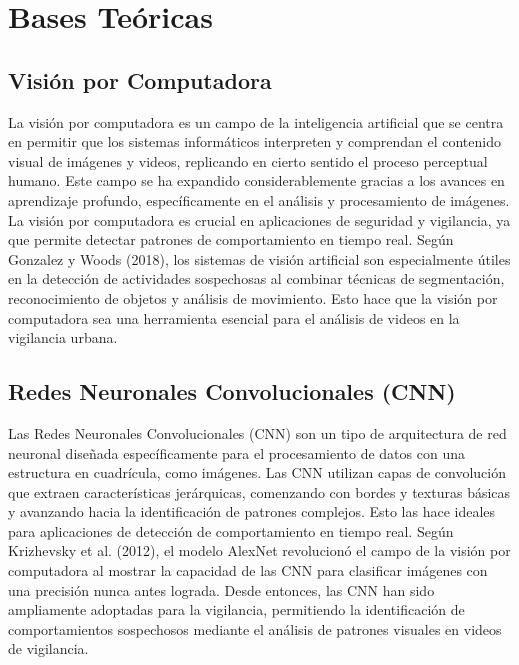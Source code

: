 \documentclass[listof=nochaptergap,12pt,times,authoryear]{report}
\begin{document}
\section{Bases Teóricas}

\subsection{Visión por Computadora}
La visión por computadora es un campo de la inteligencia artificial que se centra en permitir que los sistemas informáticos interpreten y comprendan el contenido visual de imágenes y videos, replicando en cierto sentido el proceso perceptual humano. Este campo se ha expandido considerablemente gracias a los avances en aprendizaje profundo, específicamente en el análisis y procesamiento de imágenes. La visión por computadora es crucial en aplicaciones de seguridad y vigilancia, ya que permite detectar patrones de comportamiento en tiempo real. Según Gonzalez y Woods (2018), los sistemas de visión artificial son especialmente útiles en la detección de actividades sospechosas al combinar técnicas de segmentación, reconocimiento de objetos y análisis de movimiento. Esto hace que la visión por computadora sea una herramienta esencial para el análisis de videos en la vigilancia urbana.

\subsection{Redes Neuronales Convolucionales (CNN)}
Las Redes Neuronales Convolucionales (CNN) son un tipo de arquitectura de red neuronal diseñada específicamente para el procesamiento de datos con una estructura en cuadrícula, como imágenes. Las CNN utilizan capas de convolución que extraen características jerárquicas, comenzando con bordes y texturas básicas y avanzando hacia la identificación de patrones complejos. Esto las hace ideales para aplicaciones de detección de comportamiento en tiempo real. Según Krizhevsky et al. (2012), el modelo AlexNet revolucionó el campo de la visión por computadora al mostrar la capacidad de las CNN para clasificar imágenes con una precisión nunca antes lograda. Desde entonces, las CNN han sido ampliamente adoptadas para la vigilancia, permitiendo la identificación de comportamientos sospechosos mediante el análisis de patrones visuales en videos de vigilancia.
\end{document}
